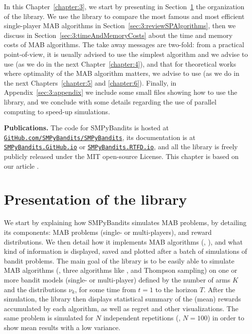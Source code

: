 In this Chapter~\ref{chapter:3}, we start by presenting in Section~\ref{sec:3:presentationLibrary} the organization of the library.
We use the library to compare the most famous and most efficient single-player MAB algorithms in Section~\ref{sec:3:reviewSPAlgorithms},
then we discuss in Section~\ref{sec:3:timeAndMemoryCosts} about the time and memory costs of MAB algorithms.
The take away messages are two-fold:
from a practical point-of-view, it is usually advised to use the simplest algorithm and we advise to use \UCB{} (as we do in the next Chapter~\ref{chapter:4}),
and that for theoretical works where optimality of the MAB algorithm matters, we advise to use \klUCB{} (as we do in the next Chapters~\ref{chapter:5} and \ref{chapter:6}).
%
Finally, in Appendix~\ref{sec:3:appendix} we include some small files showing how to use the library, and we conclude with some details regarding the use of parallel computing to speed-up simulations.


\textbf{Publications.}
%
The code for SMPyBandits is hosted at \texttt{\href{https://GitHub.com/SMPyBandits/SMPyBandits/}{GitHub.com/SMPyBandits/SMPyBandits}}, its documentation is at \texttt{\href{https://SMPyBandits.GitHub.io/}{SMPyBandits.GitHub.io}} or \texttt{\href{https://SMPyBandits.RTFD.io/}{SMPyBandits.RTFD.io}}, and all the library is freely publicly released under the MIT open-source License.
This chapter is based on our article \cite{SMPyBanditsJMLR}.


\section{Presentation of the library}
\label{sec:3:presentationLibrary}


We start by explaining how SMPyBandits simulates MAB problems, by detailing its components:
MAB problems (single- or multi-players),
and reward distributions.
%
We then detail how it implements MAB algorithms (\eg, \UCB),
and what kind of information is displayed, saved and plotted after a batch of simulations of bandit problems.
%
%
The main goal of the library is to be easily able to simulate MAB algorithms (\eg, three algorithms like \UCB, \klUCB{} and Thompson sampling) on one or more bandit models (single- or multi-player) defined by the number of arms $K$ and the distributions $\nu_k$, for some time from $t=1$ to the horizon $T$.
After the simulation, the library then displays statistical summary of the (mean) rewards accumulated by each algorithm, as well as regret and other visualizations.
The same problem is simulated for $N$ independent repetitions (\eg, $N=100$) in order to show mean results with a low variance.


